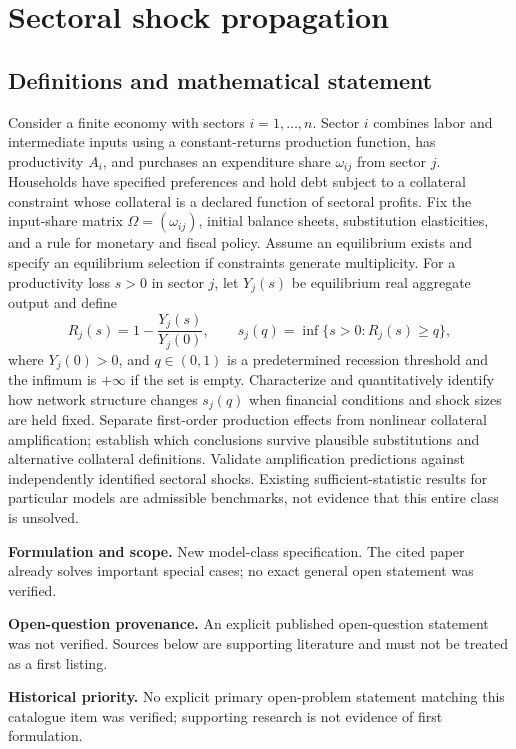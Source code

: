 \documentclass[11pt]{article}
\begin{document}
\section*{Sectoral shock propagation}\label{30007513}
\subsection{Definitions and mathematical statement}
Consider a finite economy with sectors \(i=1,\ldots,n\). Sector \(i\) combines labor and intermediate inputs using a constant-returns production function, has productivity \(A_i\), and purchases an expenditure share \(\omega_{ij}\) from sector \(j\). Households have specified preferences and hold debt subject to a collateral constraint whose collateral is a declared function of sectoral profits. Fix the input-share matrix \(\Omega=(\omega_{ij})\), initial balance sheets, substitution elasticities, and a rule for monetary and fiscal policy. Assume an equilibrium exists and specify an equilibrium selection if constraints generate multiplicity.
For a productivity loss \(s>0\) in sector \(j\), let \(Y_j(s)\) be equilibrium real aggregate output and define
\[
R_j(s)=1-\frac{Y_j(s)}{Y_j(0)},\qquad
s_j(q)=\inf\{s>0:R_j(s)\ge q\},
\]
where \(Y_j(0)>0\), and \(q\in(0,1)\) is a predetermined recession threshold and the infimum is \(+\infty\) if the set is empty. Characterize and quantitatively identify how network structure changes \(s_j(q)\) when financial conditions and shock sizes are held fixed. Separate first-order production effects from nonlinear collateral amplification; establish which conclusions survive plausible substitutions and alternative collateral definitions. Validate amplification predictions against independently identified sectoral shocks. Existing sufficient-statistic results for particular models are admissible benchmarks, not evidence that this entire class is unsolved.

\par\textbf{Formulation and scope.} New model-class specification. The cited paper already solves important special cases; no exact general open statement was verified.

\par\textbf{Open-question provenance.} An explicit published open-question statement was not verified. Sources below are supporting literature and must not be treated as a first listing.

\par\textbf{Historical priority.} No explicit primary open-problem statement matching this catalogue item was verified; supporting research is not evidence of first formulation.
\end{document}
